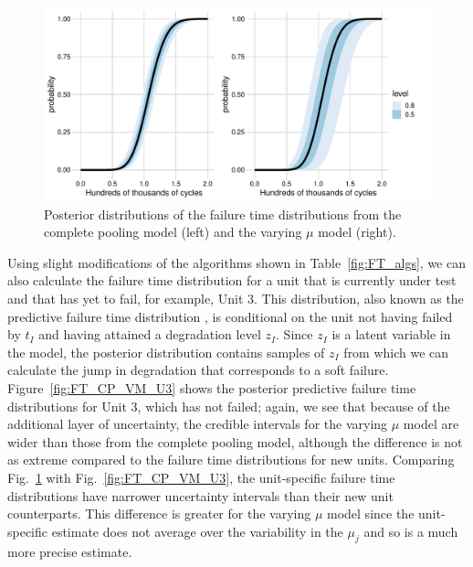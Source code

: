 \begin{figure}[tbp]
    \centering
    \includegraphics[width=0.95\columnwidth]{./figures/ch-5/FT_dist.pdf}
    \caption{Posterior distributions of the failure time distributions from the complete pooling model (left) and the varying $\mu$ model (right).}
    \label{fig:FT_CP_VM_new}
\end{figure}

Using slight modifications of the algorithms shown in Table~\ref{fig:FT_algs}, we can also calculate the failure time distribution for a unit that is currently under test and that has yet to fail, for example, Unit 3. This distribution, also known as the predictive failure time distribution \citep{lawless2004}, is conditional on the unit not having failed by $t_I$ and having attained a degradation level $z_I$. Since $z_I$ is a latent variable in the model, the posterior distribution contains samples of $z_I$ from which we can calculate the jump in degradation that corresponds to a soft failure. Figure~\ref{fig:FT_CP_VM_U3} shows the posterior predictive failure time distributions for Unit 3, which has not failed; again, we see that because of the additional layer of uncertainty, the credible intervals for the varying $\mu$ model are wider than those from the complete pooling model, although the difference is not as extreme compared to the failure time distributions for new units. Comparing Fig.~\ref{fig:FT_CP_VM_new} with Fig.~\ref{fig:FT_CP_VM_U3}, the unit-specific failure time distributions have narrower uncertainty intervals than their new unit counterparts. This difference is greater for the varying $\mu$ model since the unit-specific estimate does not average over the variability in the $\mu_j$ and so is a much more precise estimate.

